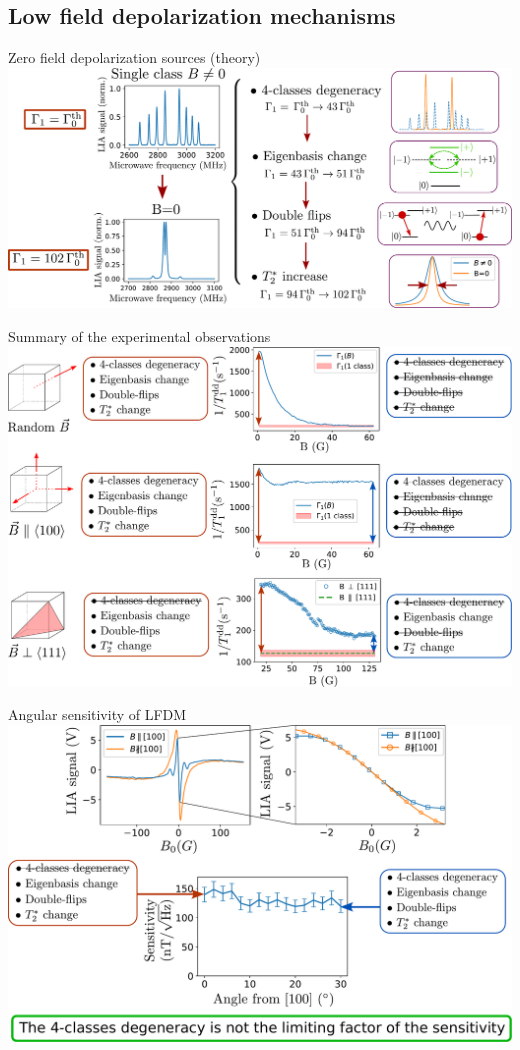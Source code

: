 \documentclass{beamer}
\begin{document}
\subsection{Low field depolarization mechanisms}
\begin{frame}{Zero field depolarization sources (theory)}
\centering
\includegraphics[width=\textwidth,height=0.85\textheight,keepaspectratio]{Slide_0B_theorie}
\end{frame}

\begin{frame}{Summary of the experimental observations}
\centering
\includegraphics[width=\textwidth,height=0.85\textheight,keepaspectratio]{shema_summary_exp}
\end{frame}

\begin{frame}{Angular sensitivity of LFDM}
\centering
\includegraphics[width=\textwidth,height=0.85\textheight,keepaspectratio]{Slide_angular_sensitivity}
\end{frame}
\end{document}
